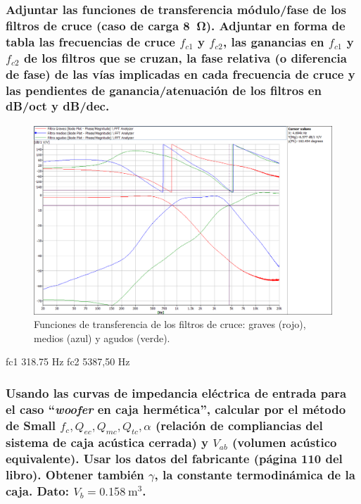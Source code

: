\documentclass[10pt]{article}
\begin{document}
\subsubsection{Adjuntar las funciones de transferencia módulo/fase de los filtros de cruce (caso de carga \qty{8}{\ohm}). Adjuntar en forma de tabla las frecuencias de cruce $f_{c1}$ y $f_{c2}$, las ganancias en $f_{c1}$ y $f_{c2}$ de los filtros que se cruzan, la fase relativa (o diferencia de fase) de las vías implicadas en cada frecuencia de cruce y las pendientes de ganancia/atenuación de los filtros en dB/oct y dB/dec.}


\begin{figure}[hbtp]
  \centering
  \includegraphics[width=\linewidth]{filtros_cruce.png}
  \caption{Funciones de transferencia de los filtros de cruce: graves (rojo), medios (azul) y agudos (verde).}
  \label{fig:filtros_cruce}
\end{figure}

fc1 318.75 Hz
fc2 5387,50 Hz

\subsubsection{Usando las curvas de impedancia eléctrica de entrada para el caso ``\textit{woofer} en caja hermética'', calcular por el método de Small $f_c, Q_{ec}, Q_{mc}, Q_{tc}, \alpha$ (relación de compliancias del sistema de caja acústica cerrada) y $V_{ab}$ (volumen acústico equivalente). Usar los datos del fabricante (página 110 del libro). Obtener también $\gamma$, la constante termodinámica de la caja. Dato: $V_b = \qty{0.158}{\metre\cubed}$.}
\end{document}

